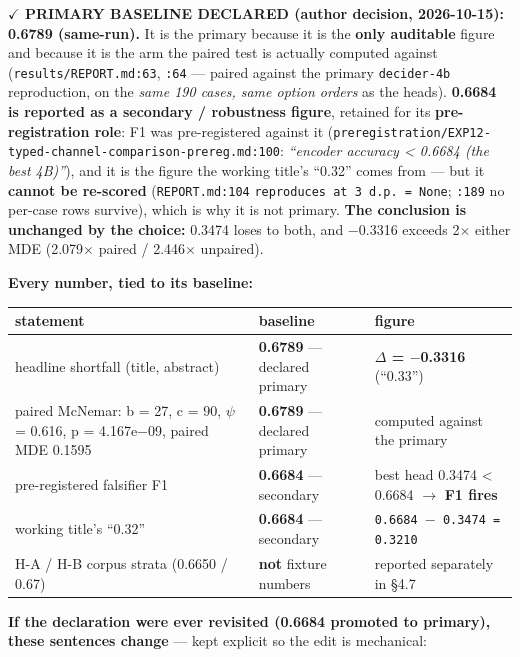 \documentclass[11pt,a4paper]{article}
\begin{document}
\textbf{$\checkmark$ PRIMARY BASELINE DECLARED (author decision, 2026-10-15): 0.6789 (same-run).} It is the primary because it is the \textbf{only auditable} figure and because it is the arm the paired test is actually computed against (\texttt{results/REPORT.md:63}, \texttt{:64} --- paired against the primary \texttt{decider-4b} reproduction, on the \emph{same 190 cases, same option orders} as the heads). \textbf{0.6684 is reported as a secondary / robustness figure}, retained for its \textbf{pre-registration role}: F1 was pre-registered against it (\texttt{preregistration/EXP12-typed-channel-comparison-prereg.md:100}: \emph{``encoder accuracy < 0.6684 (the best 4B)''}), and it is the figure the working title's ``0.32'' comes from --- but it \textbf{cannot be re-scored} (\texttt{REPORT.md:104} \texttt{reproduces at 3 d.p. = None}; \texttt{:189} no per-case rows survive), which is why it is not primary. \textbf{The conclusion is unchanged by the choice:} 0.3474 loses to both, and $-$0.3316 exceeds 2$\times$ either MDE (2.079$\times$ paired / 2.446$\times$ unpaired).

\textbf{Every number, tied to its baseline:}


\begin{center}
\begin{tabular}{@{}>{\raggedright\arraybackslash}p{}>{\raggedright\arraybackslash}p{}>{\raggedright\arraybackslash}p{}@{}}
\hline
\textbf{statement} & \textbf{baseline} & \textbf{figure} \\ \hline
headline shortfall (title, abstract) & \textbf{0.6789} --- declared primary & \textbf{$\Delta$ = $-$0.3316} (``0.33'') \\ \hline
paired McNemar: b = 27, c = 90, $\psi$ = 0.616, p = 4.167e$-$09, paired MDE 0.1595 & \textbf{0.6789} --- declared primary & computed against the primary \\ \hline
pre-registered falsifier F1 & \textbf{0.6684} --- secondary & best head 0.3474 < 0.6684 $\to$ \textbf{F1 fires} \\ \hline
working title's ``0.32'' & \textbf{0.6684} --- secondary & \texttt{0.6684 $-$ 0.3474 = 0.3210} \\ \hline
H-A / H-B corpus strata (0.6650 / 0.67) & \textbf{not} fixture numbers & reported separately in \S4.7 \\ \hline
\end{tabular}
\end{center}

\textbf{If the declaration were ever revisited (0.6684 promoted to primary), these sentences change} --- kept explicit so the edit is mechanical:
\end{document}
